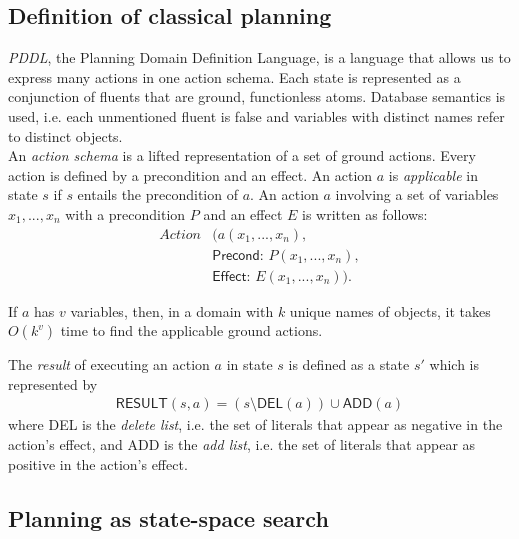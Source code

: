 \documentclass{article}
\begin{document}
\subsection{Definition of classical planning}

\begin{definition}[R\&N, p. 367]
    \emph{PDDL}, the Planning Domain Definition Language, is a language
    that allows us to express many actions in one action schema.
    Each state is represented as a conjunction of fluents that are ground,
    functionless atoms. Database semantics is used, i.e. each unmentioned
    fluent is false and variables with distinct names refer to distinct
    objects.\\
    An \emph{action schema} is a lifted representation of a set of ground
    actions. Every action is defined by a precondition and an effect. An
    action $a$ is \emph{applicable} in state $s$ if $s$ entails the precondition
    of $a$. An action $a$ involving a set of variables $x_1,...,x_n$ with
    a precondition $P$ and an effect $E$ is written as follows:
    \begin{align*}
        Action&(a(x_1, ..., x_n),\\
              &\textsf{Precond: } P(x_1, ..., x_n),\\
              &\textsf{Effect: } E(x_1, ..., x_n)).
    \end{align*}
\end{definition}

\begin{lemma}
    If $a$ has $v$ variables, then, in a domain with $k$ unique names of objects,
    it takes $O(k^v)$ time to find the applicable ground actions.
\end{lemma}

\begin{definition}
    The \emph{result} of executing an action $a$ in state $s$ is defined
    as a state $s'$ which is represented by
    \begin{align*}
        \textsf{RESULT}(s,a)=(s\setminus\textsf{DEL}(a))\cup\textsf{ADD}(a)
    \end{align*}
    where DEL is the \emph{delete list}, i.e. the set of literals that appear
    as negative in the action's effect, and ADD is the \emph{add list}, i.e.
    the set of literals that appear as positive in the action's effect.
\end{definition}

\subsection{Planning as state-space search}
\end{document}
